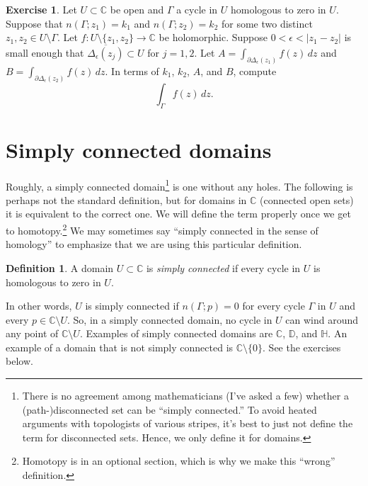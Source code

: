\documentclass[12pt,openany]{book}
\newcommand{\sabs}[1]{\lvert {#1} \rvert}
\newcommand{\C}{{\mathbb{C}}}
\newcommand{\D}{{\mathbb{D}}}
\newcommand{\bH}{{\mathbb{H}}}
\newcommand{\myquote}[1]{``#1''}
\theoremstyle{plain}
\theoremstyle{remark}
\theoremstyle{definition}
\newtheorem{defn}[thm]{Definition}
\newenvironment{exbox}{%
    \def\FrameCommand{\vrule width 1pt \relax\hspace{10pt}}%
    \MakeFramed{\advance\hsize-\width\FrameRestore}%
}{%
    \endMakeFramed
}
\theoremstyle{exercise}
\newtheorem{exercise}{Exercise}[section]
\theoremstyle{example}
\begin{document}
\begin{exbox}
\begin{exercise}
Let $U \subset \C$ be open and $\Gamma$ a cycle in $U$
homologous to zero in $U$.
Suppose that $n(\Gamma;z_1) = k_1$ and  $n(\Gamma;z_2) = k_2$ for
some two distinct $z_1,z_2 \in U \setminus \Gamma$.
Let $f \colon U \setminus \{z_1,z_2\} \to \C$ be
holomorphic.
Suppose $0< \epsilon < \sabs{z_1-z_2}$ is small enough that
$\overline{\Delta_\epsilon(z_j)} \subset U$ for $j=1,2$.
Let
$A = \int_{\partial \Delta_\epsilon(z_1)} f(z) \, dz$ and 
$B = \int_{\partial \Delta_\epsilon(z_2)} f(z) \, dz$.
In terms of $k_1$, $k_2$, $A$, and $B$,
compute
\begin{equation*}
\int_{\Gamma} f(z) \, dz .
\end{equation*}
\end{exercise}
\end{exbox}



\section{Simply connected domains}

Roughly, a simply connected domain\footnote{%
There is no agreement among mathematicians (I've asked a few) whether
a (path-)disconnected set can be \myquote{simply connected.}
To avoid heated arguments with topologists of various stripes,
it's best to just not define the term for disconnected sets.
Hence, we only define it for domains.}
is one without any holes.  The following is
perhaps not the standard definition, but for domains in $\C$
(connected open sets)
it is equivalent to the correct one.
We will define the term properly once we get 
to homotopy.\footnote{Homotopy is in an optional section, which is
why we make this \myquote{wrong} definition.}
We may sometimes say
\myquote{simply connected in the sense of homology}
to emphasize that we are using this particular definition.

\begin{defn} \label{defn:simplyconnected:homology}
A domain $U \subset \C$ is \emph{simply connected}%
if every cycle in $U$
is homologous to zero in $U$.
\end{defn}

In other words, $U$ is simply connected
if $n(\Gamma;p) = 0$ for every cycle $\Gamma$ in $U$ and
every $p \in \C \setminus U$.
So, in a simply connected domain, no cycle in $U$ can wind around any point
of $\C \setminus U$.
Examples of simply connected domains are $\C$, $\D$, and $\bH$.
An example of a domain that is not simply connected is
$\C \setminus \{ 0 \}$.
See the exercises below.
\end{document}
